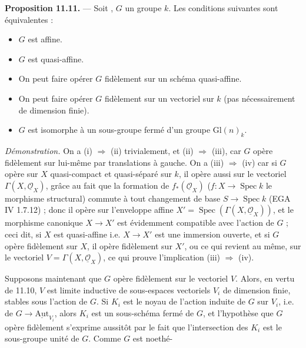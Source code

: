 \documentclass[11pt,a4paper]{article}
\begin{document}
\textbf{Proposition 11.11.} — Soit , $G$ un
 groupe 
   $k$. Les conditions
suivantes sont équivalentes :
\begin{itemize}
\item[(i)] $G$ est affine.
\item[(ii)] $G$ est quasi-affine.
\item[(iii)] On peut faire opérer $G$ fidèlement sur un schéma
quasi-affine.
\item[(iv)] On peut faire opérer $G$ fidèlement sur un vectoriel sur $k$
(pas nécessairement de dimension finie).
\item[(v)] \struck{\ill{}} $G$ est isomorphe à un sous-groupe fermé d'un
groupe $\mathrm{Gl}(n)_{k}$.
\end{itemize}

\emph{Démonstration.} On a (i) $\Rightarrow$ (ii) trivialement, et (ii)
$\Rightarrow$ (iii), car $G$ opère fidèlement sur lui-même par
translations à gauche. On a (iii) $\Rightarrow$ (iv) car si $G$ opère
\struck{\ill{}} sur $X$ quasi-compact et quasi-séparé sur $k$, il opère
aussi sur le vectoriel $\Gamma(X, \underline{\mathcal{O}}_{X})$, grâce au
fait que la formation de $f_{*}(\underline{\mathcal{O}}_{X})$
($f : X \to \operatorname{Spec} k$ le morphisme structural) commute à tout
changement de base $S \to \operatorname{Spec} k$ (EGA IV 1.7.12) ; donc il
opère sur l'enveloppe affine
$X' = \operatorname{Spec}(\Gamma(X, \underline{\mathcal{O}}_{X}))$, et le
morphisme canonique $X \to X'$ est évidemment compatible avec l'action de
$G$ ; ceci dit, si $X$ est quasi-affine i.e. $X \to X'$ est une immersion
ouverte, et si $G$ opère fidèlement sur $X$, il opère fidèlement sur $X'$,
ou ce qui revient au même, sur le vectoriel
$V = \Gamma(X, \underline{\mathcal{O}}_{X})$, ce qui prouve l'implication
(iii) $\Rightarrow$ (iv).

Supposons maintenant \struck{\ill{}} que $G$ opère
fidèlement sur le vectoriel $V$. Alors, en vertu de 11.10, $V$ est limite
inductive de sous-espaces vectoriels $V_{i}$ de dimension finie, stables
sous l'action de $G$. Si $K_{i}$ est le noyau de l'action induite de $G$
sur $V_{i}$, i.e. de $G \to \underline{\mathrm{Aut}}_{V_{i}}$, alors
$K_{i}$ est un sous-schéma fermé de $G$, et l'hypothèse que $G$ opère
fidèlement s'exprime aussitôt par le fait que \struck{\ill{}}
l'intersection des $K_{i}$ est le sous-groupe unité de $G$. Comme $G$ est
noethé-
\end{document}
